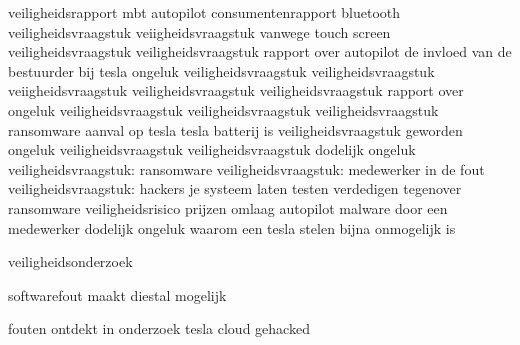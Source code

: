 \cite{evan01042019teslaautopilotIntersection}
\cite{testVehicleSafetyReport}
veiligheidsrapport mbt autopilot
\cite{lambert31062020q2safetyreport}
consumentenrapport
bluetooth veiligheidsvraagstuk
\cite{wiredBloutoothHackTesla}
veiigheidsvraagstuk vanwege touch screen
\cite{preston14012021NHTSATeslaRecall}
veiligheidsvraagstuk
\cite{cio25112020belgianTeslaHack}
veiligheidsvraagstuk
rapport over autopilot
\cite{templeton06092019HTSBReportTesla}
de invloed van de bestuurder bij tesla ongeluk
veiligheidsvraagstuk
\cite{darkReading17112020TeslaBackup}
veiligheidsvraagstuk
\cite{leyden23032020TeslaInterfaceHack}
veiigheidsvraagstuk
\cite{huddlestonjr03042019ChineseTeslaHack}
veiligheidsvraagstuk
veiligheidsvraagstuk
\cite{heilweil26022020teslaAutopilot}
rapport over ongeluk
veiligheidsvraagstuk
veiligheidsvraagstuk
\cite{blanco04102019NHTSATesla}
veiligheidsvraagstuk
ransomware aanval op tesla
tesla batterij is veiligheidsvraagstuk geworden
\cite{mitchell01072020teslabatterycooling}
ongeluk
\cite{bbc26022020AutopilotCrash}
veiligheidsvraagstuk
veiligheidsvraagstuk
\cite{stumpff04052020TeslaPersonalData}
dodelijk ongeluk
\cite{levin08062018teslaautopilotsafety}
veiligheidsvraagstuk: ransomware
veiligheidsvraagstuk: medewerker in de fout
\cite{cbrook06082021TeslaInsideDataThreft}
\cite{shilling25022021Tesla}
veiligheidsvraagstuk: hackers je systeem laten testen
verdedigen tegenover ransomware
veiligheidsrisico
prijzen omlaag
autopilot
\cite{randall05112019modelSurvey}
malware door een medewerker
dodelijk ongeluk
\cite{fottrell03092018TeslaSecurityChecks}
waarom een tesla stelen bijna onmogelijk is



veiligheidsonderzoek



softwarefout maakt diestal mogelijk


\cite{kirk26112020modelX}
fouten ontdekt in onderzoek
\cite{bbc24022021hyundaiBatteryFireFix}
tesla cloud gehacked
\cite{hawkins22102022}
\cite{gritti24062020tesladataengine}
\cite{bouchard07052019teslaDeepLearning}
\cite{Srikanth2019teslabigdata}
\cite{rangaiah25022020teslaAI}
\cite{marr08012018taslabigdataAI}
\cite{bdickson29072020teslalevelfive}
\cite{dcruz17062022tesladesignthink}
\cite{mcfarland22042021selfdrivingrisks}
\cite{hawkins18032021fedgovinvest}
\cite{berry21042021teslacrashtexas}
\cite{hull23072021regulatorsaftercrash}
\cite{wikiTeslaAutopilot}
\cite{nhtsaAutomatedVehiclesSafety}
\cite{dowling23042021autopilottricking}
\cite{wilson19042021teslacrashregulators}
\cite{seamans22062021aikillerap}
\cite{mitchell24022020AIDataTesla}
\cite{denneyjdsupraFeds}
\cite{siddiqui22102020TeslaCriticism}
\cite{ackerman01072016TeslaImperfect}
\cite{greene04092019misuseautopilot}
\cite{michralli26112019ubserautocarcrsash}
\cite{pitmann21072021wrongfullautodeath}
\cite{stackexchange102019teslacarmistake}
\cite{tasking07062017TeslaAugmentedSafety}
\cite{griemannExaminSelfDriving}
\cite{Harkey30052019SafeSystemVehicle}


